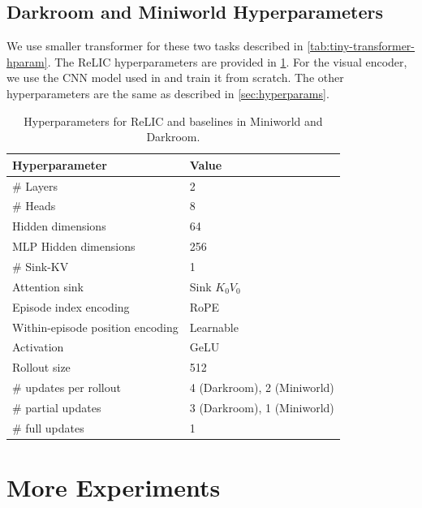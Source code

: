 \documentclass{article}
\newcommand{\method}{ReLIC\xspace}
\begin{document}
\subsection{Darkroom and Miniworld Hyperparameters}
\label{sec:dark_n_min_hyperparams}
We use smaller transformer for these two tasks described in \cref{tab:tiny-transformer-hparam}. The \method hyperparameters are provided in \cref{tab:darkroom-miniworld-hparam}. For the visual encoder, we use the CNN model used in \cite{lee2023supervisedpretraininglearnincontext} and train it from scratch. The other hyperparameters are the same as described in \cref{sec:hyperparams}.
\begin{table}[!htb]
  \centering
  \begin{tabular}{ll}
    \toprule
    Hyperparameter     & Value \\
    \midrule
    \# Layers & 2 \\
    \# Heads & 8 \\
    Hidden dimensions & 64 \\
    MLP Hidden dimensions & 256 \\
    \# Sink-KV & 1 \\
    Attention sink & Sink $K_0V_0$ \\
    Episode index encoding & RoPE \cite{su2023roformer} \\
    Within-episode position encoding & Learnable \\
    Activation & GeLU \cite{shazeer2020glu} \\
    Rollout size & 512 \\
    \# updates per rollout & 4 (Darkroom), 2 (Miniworld) \\
    \# partial updates & 3 (Darkroom), 1 (Miniworld) \\
    \# full updates & 1  \\
    \bottomrule
  \end{tabular}
  \caption{Hyperparameters for \method and baselines in Miniworld and Darkroom.}
  \label{tab:tiny-transformer-hparam}
  \label{tab:darkroom-miniworld-hparam}
\end{table}
\section{More Experiments}
\end{document}
